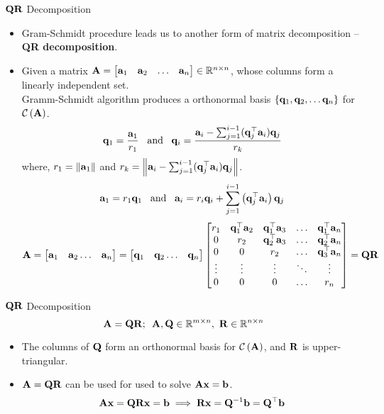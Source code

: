 \documentclass[aspectratio=169]{beamer}
\let\olditem\item
\renewcommand{\item}{\setlength{\itemsep}{\fill}\olditem}
\def\mf{\ensuremath\mathbf}
\def\mb{\ensuremath\mathbb}
\def\mc{\ensuremath\mathcal}
\def\lp{\ensuremath\left(}
\def\rp{\ensuremath\right)}
\begin{document}
\begin{frame}[t]{$\mf{QR}$ Decomposition}
\vspace{-0.25cm}
\begin{footnotesize}
\begin{itemize}
    \item Gram-Schmidt procedure leads us to another form of matrix  decomposition -- \textbf{QR decomposition}.
    \item Given a matrix $\mf{A} = \begin{bmatrix*}\mf{a}_1&\mf{a}_2&\ldots&\mf{a}_n\end{bmatrix*} \in \mb{R}^{n \times n}$, whose columns form a linearly independent set.\\
    Gramm-Schmidt algorithm produces a orthonormal basis $\left\{\mf{q}_1, \mf{q}_2, \ldots \mf{q}_n\right\}$ for $\mc{C}\lp \mf{A}\rp $.
    \[ \mf{q}_1 = \frac{\mf{a}_1}{r_1}\,\,\,\text{ and }\,\,\, \mf{q}_i = \frac{\mf{a}_i - \sum_{j=1}^{i-1}(\mf{q}_j^\top\mf{a}_i)\mf{q}_j}{r_k} \]
    where, $r_1 = \left\lVert \mf{a}_1\right\rVert$ and $r_k = \left\lVert \mf{a}_i - \sum_{j=1}^{i-1}(\mf{q}_j^\top\mf{a}_i)\mf{q}_j\right\rVert$.
    \[ \mf{a}_1 = r_1\mf{q}_1\,\,\,\text{ and }\,\,\,\mf{a}_i = r_i\mf{q}_i + \sum_{j=1}^{i-1}\lp \mf{q}_j^\top\mf{a}_i\rp \mf{q}_j\]
    \[ \mf{A} = \begin{bmatrix*}\mf{a}_1 & \mf{a}_2 \ldots & \mf{a}_n\end{bmatrix*} =  \begin{bmatrix*}\mf{q}_1 & \mf{q}_2 \ldots & \mf{q}_n\end{bmatrix*}
    \begin{bmatrix*}
    r_1 & \mf{q}_1^\top\mf{a}_2 & \mf{q}_1^\top\mf{a}_3 & \ldots & \mf{q}_1^\top\mf{a}_n\\
    0 & r_2 & \mf{q}_2^\top\mf{a}_3 & \ldots & \mf{q}_2^\top\mf{a}_n\\
    0 & 0 & r_2 & \ldots & \mf{q}_3^\top\mf{a}_n\\
    \vdots & \vdots & \vdots & \ddots & \vdots\\
    0 & 0 & 0 & \ldots & r_n\\\end{bmatrix*} = \mf{QR} \]
\end{itemize}
\end{footnotesize}
\end{frame}


\begin{frame}[t]{$\mf{QR}$ Decomposition}
\[ \mf{A} = \mf{QR}; \,\,\, \mf{A}, \mf{Q} \in \mb{R}^{m \times n},\,\, \mf{R} \in \mb{R}^{n \times n} \]
\begin{itemize}
    \item The columns of $\mf{Q}$ form an orthonormal basis for $\mc{C}\lp \mf{A}\rp$, and $\mf{R}$ is upper-triangular.
    \item $\mf{A} = \mf{QR}$ can be used for used to solve $\mf{Ax} = \mf{b}$.
    \[ \mf{Ax} = \mf{QRx} = \mf{b} \implies \mf{Rx} = \mf{Q}^{-1}\mf{b} = \mf{Q}^\top\mf{b} \]
\end{itemize}
\end{frame}
\end{document}
